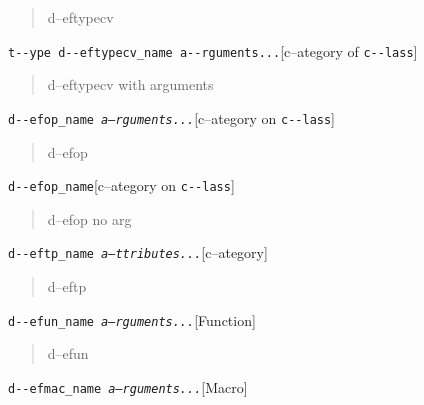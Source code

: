 \documentclass{book}
\begin{document}
%
\begin{quote}
\unskip{\parskip=0pt\noindent}%
d--eftypecv
\end{quote}

\noindent\texttt{t{-}{-}ype d{-}{-}eftypecv\_name a{-}{-}rguments...}\hfill[c--ategory of \texttt{c{-}{-}lass}]



%
\begin{quote}
\unskip{\parskip=0pt\noindent}%
d--eftypecv with arguments
\end{quote}

\noindent\texttt{d{-}{-}efop\_name \EmbracOn{}\textnormal{\textsl{a--rguments...}}\EmbracOff{}}\hfill[c--ategory on \texttt{c{-}{-}lass}]



%
\begin{quote}
\unskip{\parskip=0pt\noindent}%
d--efop
\end{quote}

\noindent\texttt{d{-}{-}efop\_name}\hfill[c--ategory on \texttt{c{-}{-}lass}]



%
\begin{quote}
\unskip{\parskip=0pt\noindent}%
d--efop no arg
\end{quote}

\noindent\texttt{d{-}{-}eftp\_name \EmbracOn{}\textnormal{\textsl{a--ttributes...}}\EmbracOff{}}\hfill[c--ategory]



%
\begin{quote}
\unskip{\parskip=0pt\noindent}%
d--eftp
\end{quote}

\noindent\texttt{d{-}{-}efun\_name \EmbracOn{}\textnormal{\textsl{a--rguments...}}\EmbracOff{}}\hfill[Function]



%
\begin{quote}
\unskip{\parskip=0pt\noindent}%
d--efun
\end{quote}

\noindent\texttt{d{-}{-}efmac\_name \EmbracOn{}\textnormal{\textsl{a--rguments...}}\EmbracOff{}}\hfill[Macro]
\end{document}
